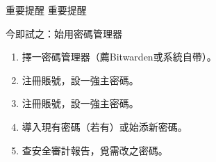 \begin{tcbwarn}{重要提醒}
重要提醒

\end{tcbwarn}

\begin{tcbpractice}{今即試之：始用密碼管理器}
\begin{enumerate}
  \item 擇一密碼管理器（薦Bitwarden或系統自帶）。
  \item 注冊賬號，設一強主密碼。
  \item 注冊賬號，設一強主密碼。
  \item 導入現有密碼（若有）或始添新密碼。
  \item 查安全審計報告，覓需改之密碼。
\end{enumerate}

\end{tcbpractice}
